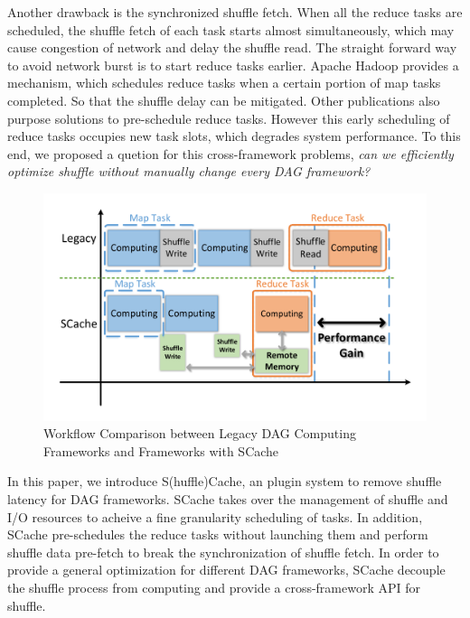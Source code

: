 Another drawback is the synchronized shuffle fetch. When all the reduce tasks are scheduled, the shuffle fetch of each task starts almost simultaneously, which may cause congestion of network and delay the shuffle read. The straight forward way to avoid network burst is to start reduce tasks earlier. Apache Hadoop\cite{hadoop} provides a mechanism, which schedules reduce tasks when a certain portion of map tasks completed. So that the shuffle delay can be mitigated. Other publications also purpose solutions to pre-schedule reduce tasks\cite{ihadoop, ishuffle, dynmr}. However this early scheduling of reduce tasks occupies new task slots, which degrades system performance. To this end, we proposed a quetion for this cross-framework problems, \textit{can we efficiently optimize shuffle without manually change every DAG framework?} 

\begin{figure}
	\centering
	\includegraphics[width=\linewidth]{fig/workflow}
	\caption{Workflow Comparison between Legacy DAG Computing Frameworks and Frameworks with SCache}
	\label{fig:workflow}
\end{figure}




In this paper, we introduce S(huffle)Cache, an plugin system to remove shuffle latency for DAG frameworks. SCache takes over the management of shuffle and I/O resources to acheive a fine granularity scheduling of tasks. In addition, SCache pre-schedules the reduce tasks without launching them and perform shuffle data pre-fetch to break the synchronization of shuffle fetch. In order to provide a general optimization for different DAG frameworks, SCache decouple the shuffle process from computing and  provide a cross-framework API for shuffle. 

